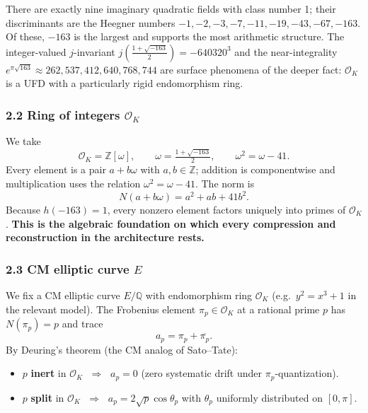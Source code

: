 \documentclass[
  11pt,
]{article}
\providecommand{\tightlist}{%
  \setlength{\itemsep}{0pt}\setlength{\parskip}{0pt}}
\begin{document}
There are exactly nine imaginary quadratic fields with class number 1;
their discriminants are the Heegner numbers
\(-1, -2, -3, -7, -11, -19, -43, -67, -163\). Of these, \(-163\) is the
largest and supports the most arithmetic structure. The integer-valued
\(j\)-invariant \(j\!\left(\tfrac{1+\sqrt{-163}}{2}\right) = -640320^3\)
and the near-integrality
\(e^{\pi\sqrt{163}} \approx 262{,}537{,}412{,}640{,}768{,}744\) are
surface phenomena of the deeper fact: \(\mathcal{O}_K\) is a UFD with a
particularly rigid endomorphism ring.

\hypertarget{ring-of-integers-mathcalo_k}{%
\subsubsection{\texorpdfstring{2.2 Ring of integers
\(\mathcal{O}_K\)}{2.2 Ring of integers \textbackslash mathcal\{O\}\_K}}\label{ring-of-integers-mathcalo_k}}

We take
\[\mathcal{O}_K = \mathbb{Z}[\omega], \qquad \omega = \tfrac{1+\sqrt{-163}}{2}, \qquad \omega^2 = \omega - 41.\]
Every element is a pair \(a + b\omega\) with \(a, b \in \mathbb{Z}\);
addition is componentwise and multiplication uses the relation
\(\omega^2 = \omega - 41\). The norm is
\[N(a + b\omega) = a^2 + ab + 41 b^2.\] Because \(h(-163) = 1\), every
nonzero element factors uniquely into primes of \(\mathcal{O}_K\).
\textbf{This is the algebraic foundation on which every compression and
reconstruction in the architecture rests.}

\hypertarget{cm-elliptic-curve-e}{%
\subsubsection{\texorpdfstring{2.3 CM elliptic curve
\(E\)}{2.3 CM elliptic curve E}}\label{cm-elliptic-curve-e}}

We fix a CM elliptic curve \(E/\mathbb{Q}\) with endomorphism ring
\(\mathcal{O}_K\) (e.g.~\(y^2 = x^3 + 1\) in the relevant model). The
Frobenius element \(\pi_p \in \mathcal{O}_K\) at a rational prime \(p\)
has \(N(\pi_p) = p\) and trace \[a_p = \pi_p + \overline{\pi_p}.\] By
Deuring's theorem (the CM analog of Sato--Tate):

\begin{itemize}
\tightlist
\item
  \(p\) \textbf{inert} in \(\mathcal{O}_K\) \(\;\Longrightarrow\;\)
  \(a_p = 0\) (zero systematic drift under \(\pi_p\)-quantization).
\item
  \(p\) \textbf{split} in \(\mathcal{O}_K\) \(\;\Longrightarrow\;\)
  \(a_p = 2\sqrt p \cos\theta_p\) with \(\theta_p\) uniformly
  distributed on \([0,\pi]\).
\end{itemize}
\end{document}
